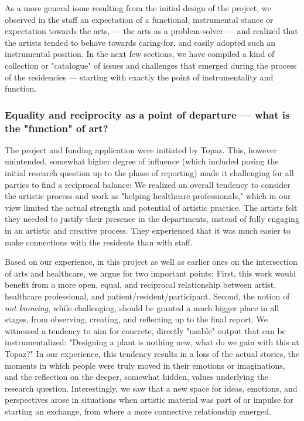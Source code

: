 \documentclass[authordate, empirical]{jote-new-article}
\begin{document}
	As a more general issue resulting from the initial design of the project, we observed in the staff an expectation of a functional, instrumental stance or expectation towards the arts, --- the arts as a problem-solver --- and realized that the artists tended to behave towards caring-for, and easily adopted such an instrumental position. In the next few sections, we have compiled a kind of collection or "catalogue" of issues and challenges that emerged during the process of the residencies --- starting with exactly the point of instrumentality and function.







	\subsubsection{Equality and reciprocity as a point of departure --- what is the "function" of art?}







	The project and funding application were initiated by Topaz. This, however unintended, somewhat higher degree of influence (which included posing the initial research question up to the phase of reporting) made it challenging for all parties to find a reciprocal balance: We realized an overall tendency to consider the artistic process and work as "helping healthcare professionals," which in our view limited the actual strength and potential of artistic practice. The artists felt they needed to justify their presence in the departments, instead of fully engaging in an artistic and creative process. They experienced that it was much easier to make connections with the residents than with staff.







	Based on our experience, in this project as well as earlier ones on the intersection of arts and healthcare, we argue for two important points: First, this work would benefit from a more open, equal, and reciprocal relationship between artist, healthcare professional, and patient/resident/participant. Second, the notion of \emph{not knowing}, while challenging, should be granted a much bigger place in all stages, from observing, creating, and reflecting up to the final report. We witnessed a tendency to aim for concrete, directly "usable" output that can be instrumentalized: "Designing a plant is nothing new, what do we gain with this at Topaz?" In our experience, this tendency results in a loss of the actual stories, the moments in which people were truly moved in their emotions or imaginations, and the reflection on the deeper, somewhat hidden, values underlying the research question. Interestingly, we saw that a new space for ideas, emotions, and perspectives arose in situations when artistic material was part of or impulse for starting an exchange, from where a more connective relationship emerged.
\end{document}
